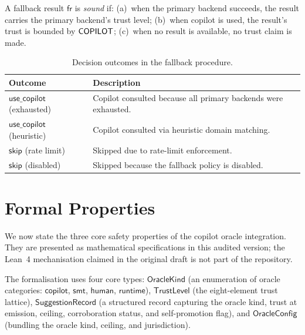 \documentclass[11pt]{article}
\begin{document}
\begin{definition}\label{def:fallback-sound}
A fallback result $\mathsf{fr}$ is \emph{sound} if:
(a)~when the primary backend succeeds, the result carries the
primary backend's trust level;
(b)~when copilot is used, the result's trust is bounded by
$\mathsf{COPILOT}$;
(c)~when no result is available, no trust claim is made.
\end{definition}

\begin{table}[ht]
\centering
\caption{Decision outcomes in the fallback procedure.}
\label{tab:fallback-outcomes}
\begin{tabular}{lp{5.5cm}}
\hline
\textbf{Outcome} & \textbf{Description} \\
\hline
$\mathsf{use\_copilot}$ (exhausted)
  & Copilot consulted because all primary backends were exhausted. \\
$\mathsf{use\_copilot}$ (heuristic)
  & Copilot consulted via heuristic domain matching. \\
$\mathsf{skip}$ (rate limit)
  & Skipped due to rate-limit enforcement. \\
$\mathsf{skip}$ (disabled)
  & Skipped because the fallback policy is disabled. \\
\hline
\end{tabular}
\end{table}


\section{Formal Properties}\label{sec:formal}

We now state the three core safety properties of the
copilot oracle integration.  They are presented as mathematical
specifications in this audited version; the Lean~4 mechanisation
claimed in the original draft is not part of the repository.

The formalisation uses four core types:
$\mathsf{OracleKind}$ (an enumeration of oracle categories:
$\mathsf{copilot}$, $\mathsf{smt}$, $\mathsf{human}$,
$\mathsf{runtime}$),
$\mathsf{TrustLevel}$ (the eight-element trust lattice),
$\mathsf{SuggestionRecord}$ (a structured record capturing the
oracle kind, trust at emission, ceiling, corroboration status,
and self-promotion flag), and
$\mathsf{OracleConfig}$ (bundling the oracle kind, ceiling, and
jurisdiction).
\end{document}
